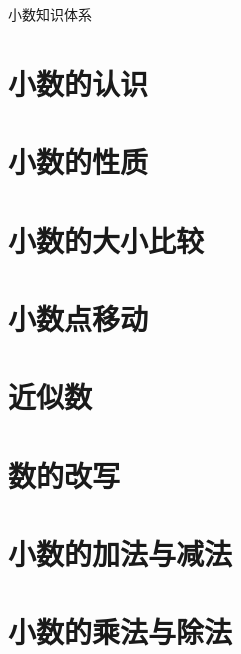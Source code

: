 \setcounter{section}{0} 


\begin{parchmentquote}
    小数知识体系
\end{parchmentquote}






\section{小数的认识}
\section{小数的性质}

\section{小数的大小比较}
\section{小数点移动}

\section{近似数}
\section{数的改写}
\section{小数的加法与减法}
\section{小数的乘法与除法}
\newpage